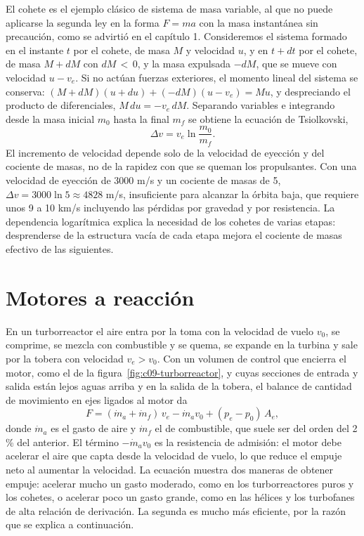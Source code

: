 \documentclass[10pt,openany]{book}
\begin{document}
El cohete es el ejemplo clásico de sistema de masa variable, al que no puede aplicarse la segunda ley en la forma \(F = ma\) con la masa instantánea sin precaución, como se advirtió en el capítulo 1. Consideremos el sistema formado en el instante \(t\) por el cohete, de masa \(M\) y velocidad \(u\), y en \(t + dt\) por el cohete, de masa \(M + dM\) con \(dM\,<\,0\), y la masa expulsada \(-dM\), que se mueve con velocidad \(u - v_e\). Si no actúan fuerzas exteriores, el momento lineal del sistema se conserva: \((M + dM)(u + du) + (-dM)(u - v_e) = Mu\), y despreciando el producto de diferenciales, \(M\,du = -v_e\,dM\). Separando variables e integrando desde la masa inicial \(m_0\) hasta la final \(m_f\) se obtiene la ecuación de Tsiolkovski,
\begin{equation}
\Delta v = v_e\ln\frac{m_0}{m_f}. \label{eq:c09-tsiolkovski}
\end{equation}
El incremento de velocidad depende solo de la velocidad de eyección y del cociente de masas, no de la rapidez con que se queman los propulsantes. Con una velocidad de eyección de 3000 m/s y un cociente de masas de 5, \(\Delta v = 3000\ln 5 \approx 4828\) m/s, insuficiente para alcanzar la órbita baja, que requiere unos 9 a 10 km/s incluyendo las pérdidas por gravedad y por resistencia. La dependencia logarítmica explica la necesidad de los cohetes de varias etapas: desprenderse de la estructura vacía de cada etapa mejora el cociente de masas efectivo de las siguientes.

\section{Motores a reacción}

En un turborreactor el aire entra por la toma con la velocidad de vuelo \(v_0\), se comprime, se mezcla con combustible y se quema, se expande en la turbina y sale por la tobera con velocidad \(v_e > v_0\). Con un volumen de control que encierra el motor, como el de la figura~\ref{fig:c09-turborreactor}, y cuyas secciones de entrada y salida están lejos aguas arriba y en la salida de la tobera, el balance de cantidad de movimiento en ejes ligados al motor da
\begin{equation}
F = (\dot m_a + \dot m_f)\,v_e - \dot m_a v_0 + (p_e - p_0)\,A_e, \label{eq:c09-turborreactor}
\end{equation}
donde \(\dot m_a\) es el gasto de aire y \(\dot m_f\) el de combustible, que suele ser del orden del 2 \% del anterior. El término \(-\dot m_a v_0\) es la resistencia de admisión: el motor debe acelerar el aire que capta desde la velocidad de vuelo, lo que reduce el empuje neto al aumentar la velocidad. La ecuación muestra dos maneras de obtener empuje: acelerar mucho un gasto moderado, como en los turborreactores puros y los cohetes, o acelerar poco un gasto grande, como en las hélices y los turbofanes de alta relación de derivación. La segunda es mucho más eficiente, por la razón que se explica a continuación.
\end{document}
